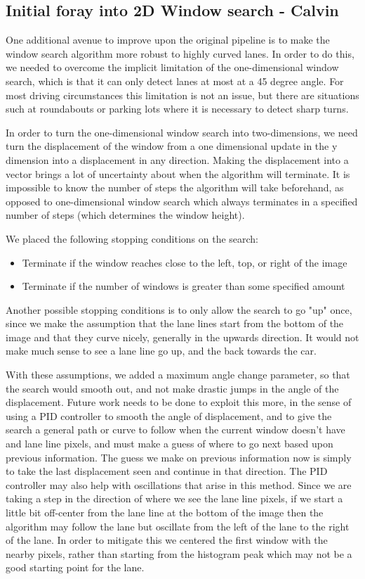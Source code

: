 \documentclass[twoside,twocolumn]{article}
\begin{document}
\subsection{Initial foray into 2D Window search - Calvin}
\par One additional avenue to improve upon the original pipeline is to make the window search algorithm more robust to highly curved lanes. In order to do this, we needed to overcome the implicit limitation of the one-dimensional window search, which is that it can only detect lanes at most at a 45 degree angle. For most driving circumstances this limitation is not an issue, but there are situations such at roundabouts or parking lots where it is necessary to detect sharp turns.
\par In order to turn the one-dimensional window search into two-dimensions, we need turn the displacement of the window from a one dimensional update in the y dimension into a displacement in any direction. Making the displacement into a vector brings a lot of uncertainty about when the algorithm will terminate. It is impossible to know the number of steps the algorithm will take beforehand, as opposed to one-dimensional window search which always terminates in a specified number of steps (which determines the window height).
\par We placed the following stopping conditions on the search:
\begin{itemize}
\item Terminate if the window reaches close to the left, top, or right of the image
\item Terminate if the number of windows is greater than some specified amount
\end{itemize}
Another possible stopping conditions is to only allow the search to go "up" once, since we make the assumption that the lane lines start from the bottom of the image and that they curve nicely, generally in the upwards direction. It would not make much sense to see a lane line go up, and the back towards the car.
\par With these assumptions, we added a maximum angle change parameter, so that the search would smooth out, and not make drastic jumps in the angle of the displacement. Future work needs to be done to exploit this more, in the sense of using a PID controller to smooth the angle of displacement, and to give the search a general path or curve to follow when the current window doesn't have and lane line pixels, and must make a guess of where to go next based upon previous information. The guess we make on previous information now is simply to take the last displacement seen and continue in that direction. The PID controller may also help with oscillations that arise in this method. Since we are taking a step in the direction of where we see the lane line pixels, if we start a little bit off-center from the lane line at the bottom of the image then the algorithm may follow the lane but oscillate from the left of the lane to the right of the lane. In order to mitigate this we centered the first window with the nearby pixels, rather than starting from the histogram peak which may not be a good starting point for the lane.
\end{document}

